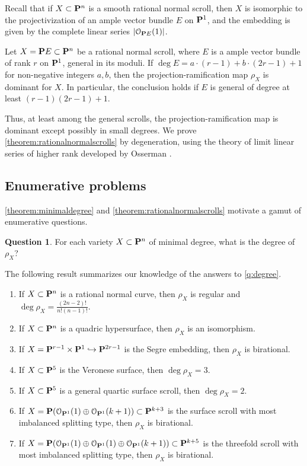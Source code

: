 \documentclass[11pt,reqno]{amsart}
\theoremstyle{plain}
\theoremstyle{definition}
\newtheorem{question}[theorem]{Question}
\theoremstyle{remark}
\numberwithin{equation}{section}
\numberwithin{equation}{section}
\renewcommand{\O}{\mathcal O}
\begin{document}
Recall that if $X \subset \P^n$ is a smooth rational normal scroll, then $X$ is isomorphic to the projectivization of an ample vector bundle $E$ on $\P^1$, and the embedding is given by the complete linear series $|\O_{\P E}(1)|$.
\begin{maintheorem}
  \label{theorem:rationalnormalscrolls}
  Let $X = \P E \subset \P^n$ be a rational normal scroll, where $E$ is a ample vector bundle of rank $r$ on $\P^1$, general in its moduli.
  If $\deg E = a \cdot (r-1) + b \cdot (2r-1) + 1$ for non-negative integers $a, b$, then the projection-ramification map $\rho_X$ is dominant for $X$.
  In particular, the conclusion holds if $E$ is general of degree at least $(r-1)(2r-1) + 1$.
\end{maintheorem}
Thus, at least among the general scrolls, the projection-ramification map is dominant except possibly in small degrees.
We prove \autoref{theorem:rationalnormalscrolls} by degeneration, using the theory of limit linear series of higher rank developed by Osserman \cite{oss:14}.

\subsection{Enumerative problems}
\autoref{theorem:minimaldegree} and \autoref{theorem:rationalnormalscrolls} motivate a gamut of enumerative questions.
\begin{question}\label{q:degree}
  For each variety $X \subset \P^n$ of minimal degree, what is the degree of $\rho_X$?
\end{question}


The following result summarizes our knowledge of the answers to \autoref{q:degree}.
\begin{maintheorem}\label{Thm:Examples}\mbox{}
\begin{enumerate}
  \item If $X \subset \P^{n}$ is a rational normal curve, then $\rho_X$ is regular and $\deg \rho_{X} = \frac{(2n-2)!}{n!(n-1)!}$.
  \item  If $X \subset \P^{n}$ is a quadric hypersurface, then $\rho_{X}$ is an isomorphism.

  \item  If  $X = \P^{r-1} \times \P^{1} \hookrightarrow \P^{2r-1}$ is the Segre embedding, then $ \rho_{X}$ is birational.

  \item  If $X \subset \P^{5}$ is the Veronese surface, then $ \deg \rho_{X} = 3$.
  \item If $X \subset \P^{5}$ is a general quartic surface scroll, then $\deg \rho_{X} = 2$.
  \item If $X = \P(\O_{\P^{1}}(1) \oplus \O_{\P^{1}}(k+1)) \subset \P^{k+3}$ is the surface scroll with most imbalanced splitting type, then $\rho_{X}$ is birational.
  \item If $X = \P(\O_{\P^{1}}(1) \oplus \O_{\P^{1}}(1) \oplus \O_{\P^{1}}(k+1)) \subset \P^{k+5}$ is the threefold scroll with most imbalanced splitting type, then $\rho_{X}$ is birational.
\end{enumerate} 
\end{maintheorem}
\end{document}
